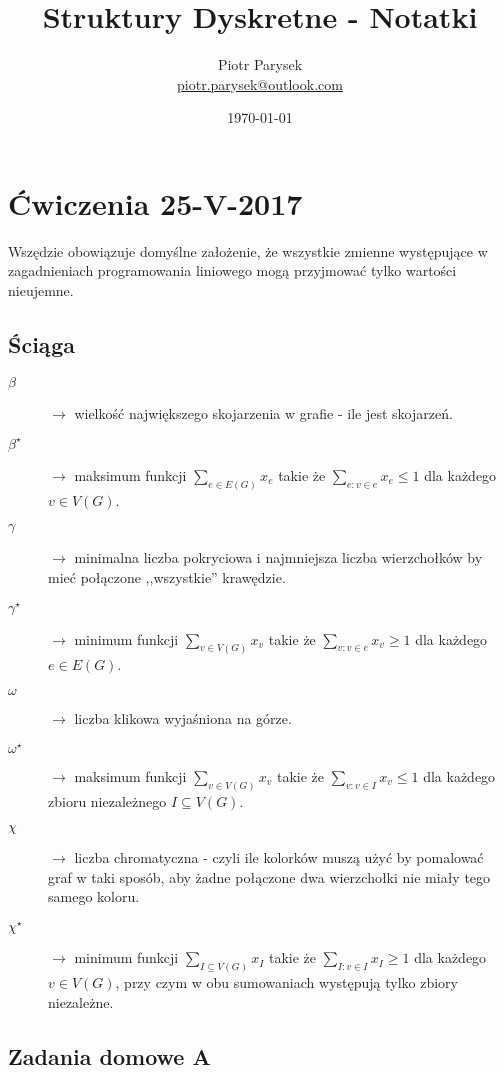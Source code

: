 \documentclass[a4paper,12pt]{article}
\title{Struktury Dyskretne - Notatki}
\author{Piotr Parysek\\
\href{mailto:piotr.parysek@outlook.com}{piotr.parysek@outlook.com} }
\date{\today}
\theoremstyle{definition}%
\theoremstyle{definition}
\theoremstyle{problem}
\begin{document}
\maketitle

\tableofcontents
\section{Ćwiczenia 25-V-2017}

Wszędzie obowiązuje domyślne założenie, że wszystkie zmienne występujące w zagadnieniach programowania liniowego mogą przyjmować tylko wartości nieujemne.
\subsection{Ściąga}
\begin{description}
\item[$\beta $] $\rightarrow$ wielkość największego skojarzenia w grafie - ile jest skojarzeń.
\item[$\beta ^\star$] $\rightarrow$ maksimum funkcji $\sum _{e\in E(G)} x_e$ takie że $\sum _{e:v\in e} x_e\leq 1$ dla każdego $v \in V (G)$.
\item[$\gamma $] $\rightarrow$ minimalna liczba pokryciowa i najmniejsza liczba wierzchołków by mieć połączone ,,wszystkie'' krawędzie.
\item[$\gamma ^\star$] $\rightarrow$ minimum funkcji $\sum _{v\in V(G)} x_v$ takie że $\sum _{v:v\in e} x_v \geq 1$ dla każdego $e \in E(G)$.
\item[$\omega $] $\rightarrow$ liczba klikowa wyjaśniona na górze. 
\item[$\omega ^\star$] $\rightarrow$ maksimum funkcji $\sum _{v\in V(G)} x_v$ takie że $\sum _{v:v\in I} x_v \leq 1$ dla każdego zbioru niezależnego $I \subseteq V(G)$.
\item[$\chi $] $\rightarrow$ liczba chromatyczna - czyli ile kolorków muszą użyć by pomalować graf w taki sposób, aby żadne połączone dwa wierzchołki nie miały tego samego koloru.
\item[$\chi ^\star$] $\rightarrow$ minimum funkcji $\sum _{I\subseteq V(G)} x_I$ takie że $\sum _{I:v\in I} x_I \geq 1$ dla każdego $v \in V(G)$, przy czym w obu sumowaniach występują tylko zbiory niezależne. 
\end{description}

\subsection{Zadania domowe A}
\end{document}
